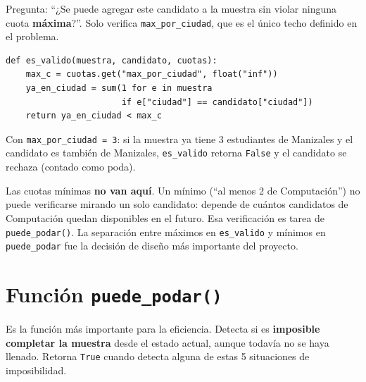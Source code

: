 \documentclass[11pt, a4paper]{article}
\begin{document}
\begin{quehaec}
Pregunta: ``¿Se puede agregar este candidato a la muestra sin violar ninguna cuota \textbf{máxima}?''. Solo verifica \texttt{max\_por\_ciudad}, que es el único techo definido en el problema.
\end{quehaec}

\begin{lstlisting}[style=python]
def es_valido(muestra, candidato, cuotas):
    max_c = cuotas.get("max_por_ciudad", float("inf"))
    ya_en_ciudad = sum(1 for e in muestra
                       if e["ciudad"] == candidato["ciudad"])
    return ya_en_ciudad < max_c
\end{lstlisting}

\begin{ejemplo}
Con \texttt{max\_por\_ciudad = 3}: si la muestra ya tiene 3 estudiantes de Manizales y el candidato es también de Manizales, \texttt{es\_valido} retorna \texttt{False} y el candidato se rechaza (contado como poda).
\end{ejemplo}

\begin{porqueimporta}
Las cuotas mínimas \textbf{no van aquí}. Un mínimo (``al menos 2 de Computación'') no puede verificarse mirando un solo candidato: depende de cuántos candidatos de Computación quedan disponibles en el futuro. Esa verificación es tarea de \texttt{puede\_podar()}. La separación entre máximos en \texttt{es\_valido} y mínimos en \texttt{puede\_podar} fue la decisión de diseño más importante del proyecto.
\end{porqueimporta}

\section{Función \texttt{puede\_podar()}}

\begin{quehaec}
Es la función más importante para la eficiencia. Detecta si es \textbf{imposible completar la muestra} desde el estado actual, aunque todavía no se haya llenado. Retorna \texttt{True} cuando detecta alguna de estas 5 situaciones de imposibilidad.
\end{quehaec}
\end{document}

